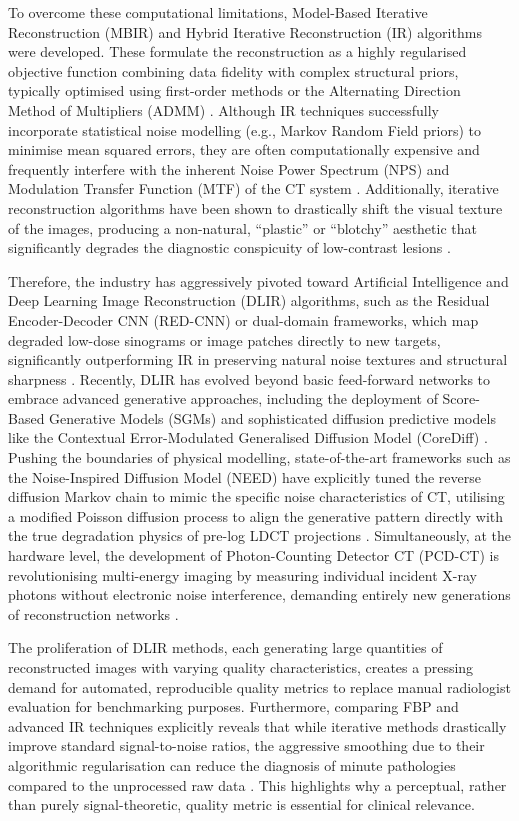 To overcome these computational limitations, Model-Based Iterative Reconstruction (MBIR)
and Hybrid Iterative Reconstruction (IR) algorithms were developed. These formulate the
reconstruction as a highly regularised objective function combining data fidelity with
complex structural priors, typically optimised using first-order methods or the
Alternating Direction Method of Multipliers (ADMM) \cite{goodfellow2016deep}. Although
IR techniques successfully incorporate statistical noise modelling (e.g., Markov Random
Field priors) to minimise mean squared errors, they are often computationally expensive
and frequently interfere with the inherent Noise Power Spectrum (NPS) and Modulation
Transfer Function (MTF) of the CT system \cite{xun2025bibliometric}. Additionally,
iterative reconstruction algorithms have been shown to drastically shift the visual
texture of the images, producing a non-natural, ``plastic'' or ``blotchy'' aesthetic that
significantly degrades the diagnostic conspicuity of low-contrast lesions
\cite{mileto2019iterative}.

Therefore, the industry has aggressively pivoted toward Artificial Intelligence and Deep
Learning Image Reconstruction (DLIR) algorithms, such as the Residual Encoder-Decoder CNN
(RED-CNN) or dual-domain frameworks, which map degraded low-dose sinograms or image
patches directly to new targets, significantly outperforming IR in preserving natural
noise textures and structural sharpness \cite{koetzier2023dlir}. Recently, DLIR has
evolved beyond basic feed-forward networks to embrace advanced generative approaches,
including the deployment of Score-Based Generative Models (SGMs) and sophisticated
diffusion predictive models like the Contextual Error-Modulated Generalised Diffusion
Model (CoreDiff) \cite{gao2024corediff}. Pushing the boundaries of physical modelling,
state-of-the-art frameworks such as the Noise-Inspired Diffusion Model (NEED) have
explicitly tuned the reverse diffusion Markov chain to mimic the specific noise
characteristics of CT, utilising a modified Poisson diffusion process to align the
generative pattern directly with the true degradation physics of pre-log LDCT projections
\cite{gao2025need}. Simultaneously, at the hardware level, the development of
Photon-Counting Detector CT (PCD-CT) is revolutionising multi-energy imaging by measuring
individual incident X-ray photons without electronic noise interference, demanding entirely
new generations of reconstruction networks \cite{willemink2013iterative}.

The proliferation of DLIR methods, each generating large quantities of reconstructed
images with varying quality characteristics, creates a pressing demand for automated,
reproducible quality metrics to replace manual radiologist evaluation for benchmarking
purposes. Furthermore, comparing FBP and advanced IR techniques explicitly reveals that
while iterative methods drastically improve standard signal-to-noise ratios, the
aggressive smoothing due to their algorithmic regularisation can reduce the diagnosis of
minute pathologies compared to the unprocessed raw data \cite{smits2007minor}. This
highlights why a perceptual, rather than purely signal-theoretic, quality metric is
essential for clinical relevance.


